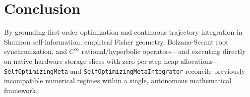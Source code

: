 \documentclass[10pt,twocolumn,letterpaper]{article}
\theoremstyle{definition}
\theoremstyle{remark}
\begin{document}
\section{Conclusion}

By grounding first-order optimization and continuous trajectory integration in Shannon self-information, empirical Fisher geometry, Bolzano-Secant root synchronization, and $C^\infty$ rational/hyperbolic operators---and executing directly on native hardware storage slices with zero per-step heap allocations---\texttt{SelfOptimizingMeta} and \texttt{SelfOptimizingMetaIntegrator} reconcile previously incompatible numerical regimes within a single, autonomous mathematical framework.

\printbibliography
\end{document}
